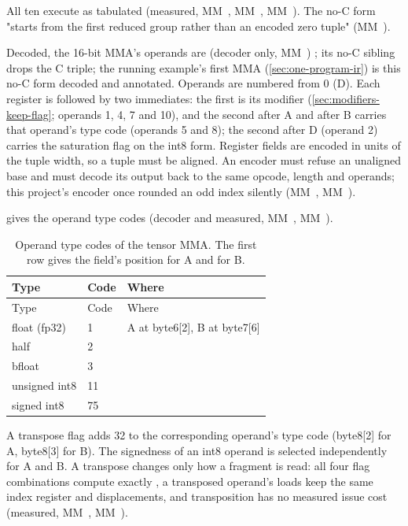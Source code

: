 All ten execute as tabulated (measured, MM~, MM~, MM~). The no-C form "starts from the first reduced group rather
than an encoded zero tuple" (MM~).

Decoded, the 16-bit MMA's operands are (decoder only, MM~)
; its no-C sibling drops the
C triple; the running example's first MMA (\cref{sec:one-program-ir}) is this no-C form decoded and annotated. Operands are
numbered from 0 (D). Each register is followed by two immediates: the first is its modifier
(\cref{sec:modifiers-keep-flag}; operands 1, 4, 7 and 10), and the second after A and after B carries that operand's type code
(operands 5 and 8); the second after D (operand 2) carries the saturation flag on the int8 form. Register fields are encoded in units of the tuple width, so a tuple must be
aligned. An encoder must refuse an unaligned base and must decode its output back to the same opcode, length and
operands; this project's encoder once rounded an odd index silently (MM~, MM~).

 gives the operand type codes (decoder and measured, MM~, MM~).

\begin{xltabular}{\linewidth}{@{}llX@{}}
\caption{Operand type codes of the tensor MMA. The first row gives the field's position for A and for B.}\label{tab:mma-type-codes}\\
\toprule
Type & Code & Where \\
\midrule
\endfirsthead
{}
\toprule
Type & Code & Where \\
\midrule
\endhead
float (fp32) & 1 & A at byte6{[}2{]}, B at byte7{[}6{]} \\*
half & 2 &  \\*
bfloat & 3 &  \\*
unsigned int8 & 11 &  \\*
signed int8 & 75 &  \\*
\bottomrule
\end{xltabular}

A transpose flag adds 32 to the corresponding operand's type code (byte8{[}2{]} for A, byte8{[}3{]} for B). The signedness of
an int8 operand is selected independently for A and B. A transpose changes only how a fragment is read:
all four flag combinations compute exactly , a transposed operand's loads keep the same index register
and displacements, and transposition has no measured issue cost (measured, MM~, MM~).

